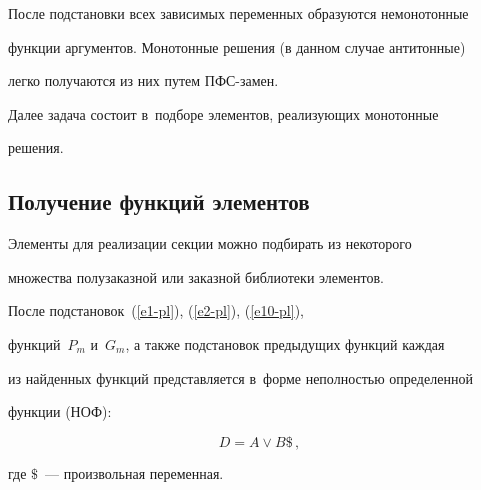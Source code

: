    


   После подстановки всех зависимых переменных образуются немонотонные 


функции аргументов. Монотонные решения (в данном случае антитонные) 


легко получаются из них путем ПФС-замен.


   


   Далее задача состоит в~подборе элементов, реализующих монотонные 


решения.





\vspace*{-3pt}





\subsection{Получение функций элементов}





\vspace*{-3pt}


       


   Элементы для реализации секции можно подбирать из некоторого 


множества полузаказной или заказной библиотеки элементов.


   


   После подстановок~(\ref{e1-pl}), (\ref{e2-pl}), (\ref{e10-pl}), 


функций~$P_m$ и~$G_m$, а также подстановок предыдущих функций каждая 


из найденных функций представляется в~форме неполностью определенной 


функции (НОФ):





\noindent


   \begin{equation}


D = A \vee B \$\,,


\label{e14-pl}


\end{equation}


где $\$$~--- произвольная переменная.






